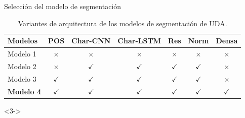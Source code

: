 \documentclass{beamer}
\begin{document}
\begin{frame}{Selección del modelo de segmentación}
    \begin{table}
        \begin{center}
            \begin{tabular}{|l|c|c|c|c|c|c|} \hline
            Modelos 		& POS       & Char-CNN  & Char-LSTM & Res       & Norm      & Densa  \\ \hline
            Modelo 1		& $\times$	& $\times$    & $\times$    & $\times$	& $\times$    & $\times$ \\ \hline
            Modelo 2		& $\times$	& $\checkmark$    & $\checkmark$    & $\checkmark$	& $\checkmark$    & $\times$ \\ \hline
            Modelo 3		& $\checkmark$	& $\checkmark$    & $\checkmark$    & $\checkmark$	& $\checkmark$    & $\times$ \\ \hline
            \textbf<2->{Modelo 4}		& $\checkmark$	& $\checkmark$    & $\checkmark$    & $\checkmark$	& $\checkmark$    & $\checkmark$ \\ \hline
            \end{tabular}
        \caption{Variantes de arquitectura de los modelos de segmentación de UDA.}\label{table:segmenter_architecture_table}
        \end{center}
    \end{table}
    \begin{onlyenv}<3->
        \begin{table}
            \begin{center}
            \caption{Métricas del segmentador en su versión completa y BIOES.}\label{table:test_metrics_segmenter}
            \end{center}
        \end{table}
    \end{onlyenv}
\end{frame}
\end{document}
